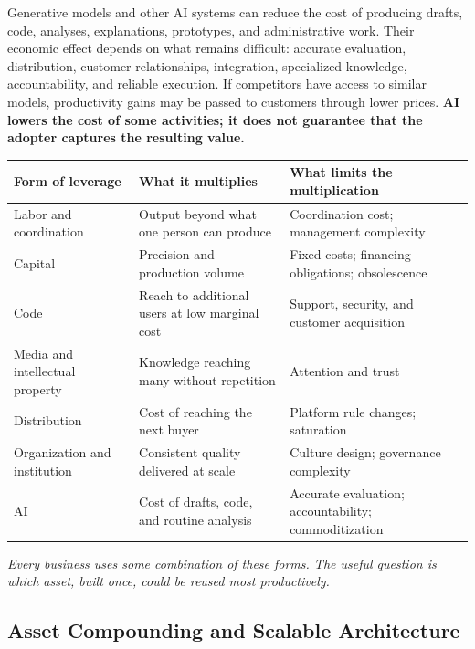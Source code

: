 \par\vspace{1pt}
Generative models and other AI systems can reduce the cost of producing drafts, code, analyses, explanations, prototypes, and administrative work. Their economic effect depends on what remains difficult: accurate evaluation, distribution, customer relationships, integration, specialized knowledge, accountability, and reliable execution. If competitors have access to similar models, productivity gains may be passed to customers through lower prices. \textbf{AI lowers the cost of some activities; it does not guarantee that the adopter captures the resulting value.}

\begin{table}[H]
\small
\centering
\renewcommand{\arraystretch}{1.3}
\setlength{\tabcolsep}{5pt}
\begin{tabular}{@{}p{}p{}p{}@{}}
\hline
\textbf{Form of leverage} & \textbf{What it multiplies} & \textbf{What limits the multiplication} \\
\hline
Labor and coordination & Output beyond what one person can produce & Coordination cost; management complexity \\
Capital & Precision and production volume & Fixed costs; financing obligations; obsolescence \\
Code & Reach to additional users at low marginal cost & Support, security, and customer acquisition \\
Media and intellectual property & Knowledge reaching many without repetition & Attention and trust \\
Distribution & Cost of reaching the next buyer & Platform rule changes; saturation \\
Organization and institution & Consistent quality delivered at scale & Culture design; governance complexity \\
AI & Cost of drafts, code, and routine analysis & Accurate evaluation; accountability; commoditization \\
\hline
\end{tabular}
\par\vspace{3pt}
{\footnotesize\itshape Every business uses some combination of these forms. The useful question is which asset, built once, could be reused most productively.}
\end{table}

\subsection{Asset Compounding and Scalable Architecture}

